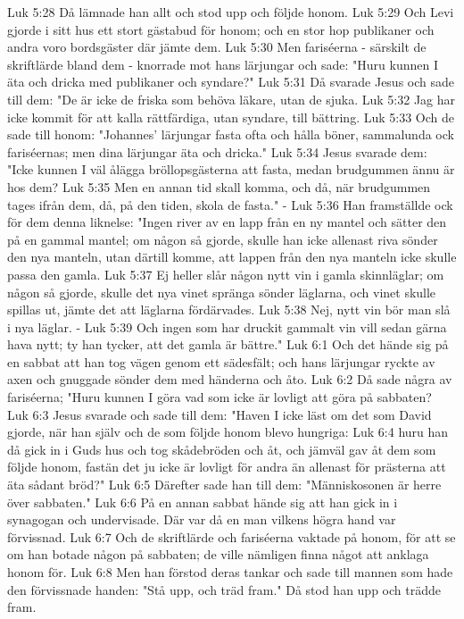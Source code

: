Luk 5:28  Då lämnade han allt och stod upp och följde honom.
Luk 5:29  Och Levi gjorde i sitt hus ett stort gästabud för honom; och en stor hop publikaner och andra voro bordsgäster där jämte dem.
Luk 5:30  Men fariséerna - särskilt de skriftlärde bland dem - knorrade mot hans lärjungar och sade: "Huru kunnen I äta och dricka med publikaner och syndare?"
Luk 5:31  Då svarade Jesus och sade till dem: "De är icke de friska som behöva läkare, utan de sjuka.
Luk 5:32  Jag har icke kommit för att kalla rättfärdiga, utan syndare, till bättring.
Luk 5:33  Och de sade till honom: "Johannes' lärjungar fasta ofta och hålla böner, sammalunda ock fariséernas; men dina lärjungar äta och dricka."
Luk 5:34  Jesus svarade dem: "Icke kunnen I väl ålägga bröllopsgästerna att fasta, medan brudgummen ännu är hos dem?
Luk 5:35  Men en annan tid skall komma, och då, när brudgummen tages ifrån dem, då, på den tiden, skola de fasta." -
Luk 5:36  Han framställde ock för dem denna liknelse: "Ingen river av en lapp från en ny mantel och sätter den på en gammal mantel; om någon så gjorde, skulle han icke allenast riva sönder den nya manteln, utan därtill komme, att lappen från den nya manteln icke skulle passa den gamla.
Luk 5:37  Ej heller slår någon nytt vin i gamla skinnläglar; om någon så gjorde, skulle det nya vinet spränga sönder läglarna, och vinet skulle spillas ut, jämte det att läglarna fördärvades.
Luk 5:38  Nej, nytt vin bör man slå i nya läglar. -
Luk 5:39  Och ingen som har druckit gammalt vin vill sedan gärna hava nytt; ty han tycker, att det gamla är bättre."
Luk 6:1  Och det hände sig på en sabbat att han tog vägen genom ett sädesfält; och hans lärjungar ryckte av axen och gnuggade sönder dem med händerna och åto.
Luk 6:2  Då sade några av fariséerna; "Huru kunnen I göra vad som icke är lovligt att göra på sabbaten?
Luk 6:3  Jesus svarade och sade till dem: "Haven I icke läst om det som David gjorde, när han själv och de som följde honom blevo hungriga:
Luk 6:4  huru han då gick in i Guds hus och tog skådebröden och åt, och jämväl gav åt dem som följde honom, fastän det ju icke är lovligt för andra än allenast för prästerna att äta sådant bröd?"
Luk 6:5  Därefter sade han till dem: "Människosonen är herre över sabbaten."
Luk 6:6  På en annan sabbat hände sig att han gick in i synagogan och undervisade. Där var då en man vilkens högra hand var förvissnad.
Luk 6:7  Och de skriftlärde och fariséerna vaktade på honom, för att se om han botade någon på sabbaten; de ville nämligen finna något att anklaga honom för.
Luk 6:8  Men han förstod deras tankar och sade till mannen som hade den förvissnade handen: "Stå upp, och träd fram." Då stod han upp och trädde fram.
